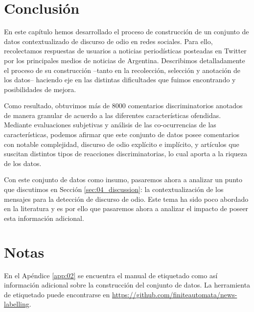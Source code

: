 \section{Conclusión}


En este capítulo hemos desarrollado el proceso de construcción de un conjunto de datos contextualizado de discurso de odio en redes sociales. Para ello, recolectamos respuestas de usuarios a noticias periodísticas posteadas en Twitter por los principales medios de noticias de Argentina. Describimos detalladamente el proceso de su construcción --tanto en la recolección, selección y anotación de los datos-- haciendo eje en las distintas dificultades que fuimos encontrando y posibilidades de mejora.

Como resultado, obtuvimos más de \num{8000} comentarios discriminatorios anotados de manera granular de acuerdo a las diferentes características ofendidas. Mediante evaluaciones subjetivas y análisis de las co-ocurrencias de las características, podemos afirmar que este conjunto de datos posee comentarios con notable complejidad, discurso de odio explícito e implícito, y artículos que suscitan distintos tipos de reacciones discriminatorias, lo cual aporta a la riqueza de los datos.

Con este conjunto de datos como insumo, pasaremos ahora a analizar un punto que discutimos en Sección \ref{sec:04_discussion}: la contextualización de los mensajes para la detección de discurso de odio. Este tema ha sido poco abordado en la literatura y es por ello que pasaremos ahora a analizar el impacto de poseer esta información adicional.

\section{Notas}


En el Apéndice \ref{app:02} se encuentra el manual de etiquetado como así información adicional sobre la construcción del conjunto de datos. La herramienta de etiquetado puede encontrarse en \url{https://github.com/finiteautomata/news-labelling}.
